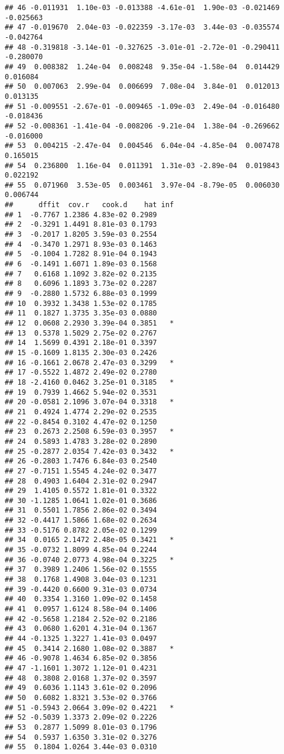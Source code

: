\documentclass[
]{article}
\begin{document}
\begin{verbatim}
## 46 -0.011931  1.10e-03 -0.013388 -4.61e-01  1.90e-03 -0.021469 -0.025663
## 47 -0.019670  2.04e-03 -0.022359 -3.17e-03  3.44e-03 -0.035574 -0.042764
## 48 -0.319818 -3.14e-01 -0.327625 -3.01e-01 -2.72e-01 -0.290411 -0.280070
## 49  0.008382  1.24e-04  0.008248  9.35e-04 -1.58e-04  0.014429  0.016084
## 50  0.007063  2.99e-04  0.006699  7.08e-04  3.84e-01  0.012013  0.013135
## 51 -0.009551 -2.67e-01 -0.009465 -1.09e-03  2.49e-04 -0.016480 -0.018436
## 52 -0.008361 -1.41e-04 -0.008206 -9.21e-04  1.38e-04 -0.269662 -0.016000
## 53  0.004215 -2.47e-04  0.004546  6.04e-04 -4.85e-04  0.007478  0.165015
## 54  0.236800  1.16e-04  0.011391  1.31e-03 -2.89e-04  0.019843  0.022192
## 55  0.071960  3.53e-05  0.003461  3.97e-04 -8.79e-05  0.006030  0.006744
##      dffit  cov.r   cook.d    hat inf
## 1  -0.7767 1.2386 4.83e-02 0.2989    
## 2  -0.3291 1.4491 8.81e-03 0.1793    
## 3  -0.2017 1.8205 3.59e-03 0.2554    
## 4  -0.3470 1.2971 8.93e-03 0.1463    
## 5  -0.1004 1.7282 8.91e-04 0.1943    
## 6  -0.1491 1.6071 1.89e-03 0.1568    
## 7   0.6168 1.1092 3.82e-02 0.2135    
## 8   0.6096 1.1893 3.73e-02 0.2287    
## 9  -0.2880 1.5732 6.88e-03 0.1999    
## 10  0.3932 1.3438 1.53e-02 0.1785    
## 11  0.1827 1.3735 3.35e-03 0.0880    
## 12  0.0608 2.2930 3.39e-04 0.3851   *
## 13  0.5378 1.5029 2.75e-02 0.2767    
## 14  1.5699 0.4391 2.18e-01 0.3397    
## 15 -0.1609 1.8135 2.30e-03 0.2426    
## 16 -0.1661 2.0678 2.47e-03 0.3299   *
## 17 -0.5522 1.4872 2.49e-02 0.2780    
## 18 -2.4160 0.0462 3.25e-01 0.3185   *
## 19  0.7939 1.4662 5.94e-02 0.3531    
## 20 -0.0581 2.1096 3.07e-04 0.3318   *
## 21  0.4924 1.4774 2.29e-02 0.2535    
## 22 -0.8454 0.3102 4.47e-02 0.1250    
## 23  0.2673 2.2508 6.59e-03 0.3957   *
## 24  0.5893 1.4783 3.28e-02 0.2890    
## 25 -0.2877 2.0354 7.42e-03 0.3432   *
## 26 -0.2803 1.7476 6.84e-03 0.2540    
## 27 -0.7151 1.5545 4.24e-02 0.3477    
## 28  0.4903 1.6404 2.31e-02 0.2947    
## 29  1.4105 0.5572 1.81e-01 0.3322    
## 30 -1.1285 1.0641 1.02e-01 0.3686    
## 31  0.5501 1.7856 2.86e-02 0.3494    
## 32 -0.4417 1.5866 1.68e-02 0.2634    
## 33 -0.5176 0.8782 2.05e-02 0.1299    
## 34  0.0165 2.1472 2.48e-05 0.3421   *
## 35 -0.0732 1.8099 4.85e-04 0.2244    
## 36 -0.0740 2.0773 4.98e-04 0.3225   *
## 37  0.3989 1.2406 1.56e-02 0.1555    
## 38  0.1768 1.4908 3.04e-03 0.1231    
## 39 -0.4420 0.6600 9.31e-03 0.0734    
## 40  0.3354 1.3160 1.09e-02 0.1458    
## 41  0.0957 1.6124 8.58e-04 0.1406    
## 42 -0.5658 1.2184 2.52e-02 0.2186    
## 43  0.0680 1.6201 4.31e-04 0.1367    
## 44 -0.1325 1.3227 1.41e-03 0.0497    
## 45  0.3414 2.1680 1.08e-02 0.3887   *
## 46 -0.9078 1.4634 6.85e-02 0.3856    
## 47 -1.1601 1.3072 1.12e-01 0.4231    
## 48  0.3808 2.0168 1.37e-02 0.3597    
## 49  0.6036 1.1143 3.61e-02 0.2096    
## 50  0.6082 1.8321 3.53e-02 0.3766    
## 51 -0.5943 2.0664 3.09e-02 0.4221   *
## 52 -0.5039 1.3373 2.09e-02 0.2226    
## 53  0.2877 1.5099 8.01e-03 0.1796    
## 54  0.5937 1.6350 3.31e-02 0.3276    
## 55  0.1804 1.0264 3.44e-03 0.0310
\end{verbatim}
\end{document}
